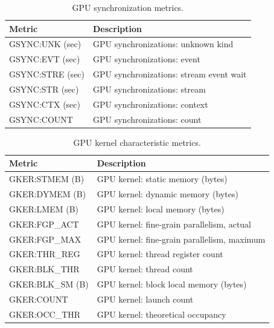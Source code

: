 \begin{table}[h]
\centering
\begin{tabular}{|l|l|}\hline
Metric & Description\\\hline\hline
 GSYNC:UNK (sec)  &  GPU synchronizations: unknown kind  \\\hline 
  GSYNC:EVT (sec)  &  GPU synchronizations: event  \\\hline 
  GSYNC:STRE (sec)  &  GPU synchronizations: stream event wait  \\\hline 
  GSYNC:STR (sec)  &  GPU synchronizations: stream  \\\hline 
  GSYNC:CTX (sec)  &  GPU synchronizations: context  \\\hline 
  GSYNC:COUNT  &  GPU synchronizations: count  \\\hline 
\end{tabular}
\caption{GPU synchronization metrics.}
\label{table:gsync}
\end{table}


\begin{table}[h]
\centering
\begin{tabular}{|l|l|}\hline
Metric & Description\\\hline\hline
GKER:STMEM (B) & GPU kernel: static memory (bytes)    \\\hline
GKER:DYMEM (B) & GPU kernel: dynamic memory (bytes)   \\\hline
GKER:LMEM (B) & GPU kernel: local memory (bytes)    \\\hline
GKER:FGP\_ACT & GPU kernel: fine-grain parallelism, actual    \\\hline
GKER:FGP\_MAX & GPU kernel: fine-grain parallelism, maximum    \\\hline
GKER:THR\_REG & GPU kernel: thread register count    \\\hline
GKER:BLK\_THR & GPU kernel: thread count   \\\hline
GKER:BLK\_SM (B) & GPU kernel: block local memory (bytes)   \\\hline
GKER:COUNT & GPU kernel: launch count   \\\hline
GKER:OCC\_THR & GPU kernel: theoretical occupancy    \\\hline
\end{tabular}
\caption{GPU kernel characteristic metrics.}
\label{table:gker}
\end{table}

